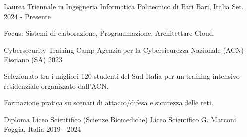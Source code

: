 
\vspace{0.3cm}

\begin{cventries}

  \cventry
    {Laurea Triennale in Ingegneria Informatica}
    {Politecnico di Bari}
    {Bari, Italia}
    {Set. 2024 - Presente}
    {
      \begin{cvitems}
        \item {Focus: Sistemi di elaborazione, Programmazione, Architetture Cloud.}
      \end{cvitems}
    }

  \vspace{0.8cm}

  \cventry
    {Cybersecurity Training Camp}
    {Agenzia per la Cybersicurezza Nazionale (ACN)}
    {Fisciano (SA)}
    {2023}
    {
      \begin{cvitems}
        \item {Selezionato tra i migliori 120 studenti del Sud Italia per un training intensivo residenziale organizzato dall'ACN.}
        \item {Formazione pratica su scenari di attacco/difesa e sicurezza delle reti.}
      \end{cvitems}
    }

  \vspace{0.8cm}

  \cventry
    {Diploma Liceo Scientifico (Scienze Biomediche)}
    {Liceo Scientifico G. Marconi}
    {Foggia, Italia}
    {2019 - 2024}
    {
    }

\end{cventries}
